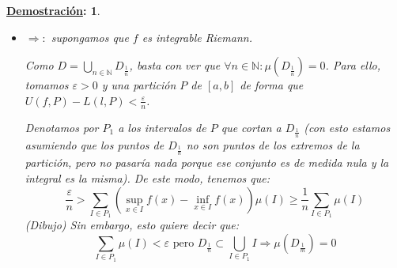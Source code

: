 \documentclass[10pt,a4paper,openright]{book}
\theoremstyle{break}
\newtheorem*{demo}{\underline{Demostración}:}
\begin{document}
\begin{demo}
\begin{itemize}
Para cada intervalo $I\in P_2$, realizamos el siguiente procedimiento:
$$\forall I \in P_2:  \left(x \in I \Rightarrow o\left(f, x\right) < \varepsilon\right) \Rightarrow \exists I_x \subset I: \forall y, z \in I_x: \vert f\left(y\right) - f\left(z\right) \vert < \varepsilon$$
Y esto puede hacerse porque para cada $x$, podemos encontrar un $\delta$ de forma que en $(x-\delta, x+\delta)$ la oscilación es menor que $\varepsilon$ y precisamente ese sería un posible $I_x$.

Recubrimos $I$ (que es compacto por ser cerrado) por una cantidad finita de estos $I_x$ y, de esta manera, obtenemos en forma de partición (quitando trozos de intervalos si fuese necesario para que sean disjuntos) el intervalo $I$ inicial. Esto, genera otra partición de la parte que correspondía a $P_2$ que denotamos por $P^*_2$ y definimos $P^* := P_1 \cup P_2^*$ como nueva partición del intervalo.

De este modo, tenemos que:
$$U\left(f, P^* \right) - L\left(f, P^*\right) = \sum_{I\in P^*} \left(\sup_{x \in I} f \left(x\right) - \inf_{x \in I} f\left(x\right) \right) \mu\left(I\right) = $$
$$=\sum_{I \in P_1} \left( \sup_{x \in I} f \left(x\right) - \inf_{x \in I} f\left(x\right) \right) \mu\left(I\right) + \sum_{I \in P_2^*} \left(\sup_{x \in I} f \left(x\right) - \inf_{x \in I} f\left(x\right) \right) \mu\left(I\right) \le $$
$$ \leq 2M\varepsilon + \varepsilon\left(b - a\right) = \left(b - a + 2M\right) \varepsilon$$
Por el Criterio de Cauchy, $f$ es integrable Rienmann.

\item $\Rightarrow:$ supongamos que $f$ es integrable Riemann.

Como $D = \bigcup_{n \in \mathbb{N}} D_{\frac{1}{n}}$, basta con ver que $\forall n \in \mathbb{N}: \mu\left(D_{\frac{1}{n}}\right) = 0$. Para ello, tomamos $\varepsilon > 0$ y una partición $P$ de $\left[a, b\right]$ de forma que $U\left(f, P\right) - L\left(l, P\right) < \frac{\varepsilon}{n}$.

Denotamos por $P_1$ a los intervalos de $P$ que cortan a $D_{\frac{1}{n}}$ (con esto estamos asumiendo que los puntos de $D_{\frac{1}{n}}$ no son puntos de los extremos de la partición, pero no pasaría nada porque ese conjunto es de medida nula y la integral es la misma). De este modo, tenemos que:
$$\frac{\varepsilon}{n} > \sum_{I \in P_1} \left(\sup_{x \in I} f\left(x\right) - \inf_{x \in I} f\left(x\right) \right) \mu\left(I\right) \ge \frac{1}{n} \sum_{I \in P_1} \mu\left(I\right)$$
(\textit{Dibujo})
Sin embargo, esto quiere decir que:
$$\sum_{I \in P_1} \mu\left(I\right) < \varepsilon \mbox{ pero } D_{\frac{1}{n}} \subset \bigcup_{I \in P_1} I \Rightarrow \mu\left(D_{\frac{1}{m}}\right) = 0$$
\end{itemize}
\end{demo}
\end{document}
